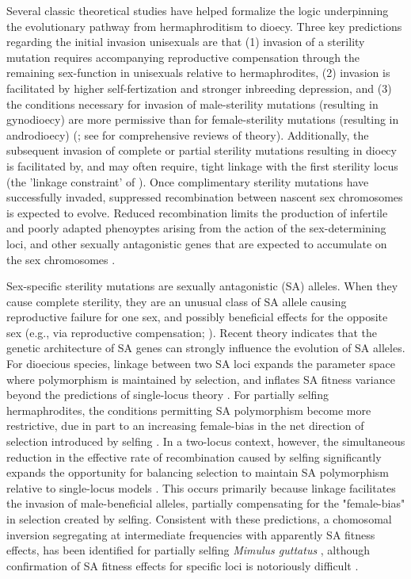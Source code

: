 \documentclass[9pt,twocolumn,twoside,lineno]{gsajnl}
\begin{document}
Several classic theoretical studies have helped formalize the logic underpinning the evolutionary pathway from hermaphroditism to dioecy. Three key predictions regarding the initial invasion unisexuals are that (1) invasion of a sterility mutation requires accompanying reproductive compensation through the remaining sex-function in unisexuals relative to hermaphrodites, (2) invasion is facilitated by higher self-fertization and stronger inbreeding depression, and (3) the conditions necessary for invasion of male-sterility mutations (resulting in gynodioecy) are more permissive than for female-sterility mutations (resulting in androdioecy) (\citealt{Lewis1941,Lloyd1975,Lloyd1976,Charlesworth1978a}; see \citealt{Charlesworth1999,Charlesworth2006} for comprehensive reviews of theory). Additionally, the subsequent invasion of complete or partial sterility mutations resulting in dioecy is facilitated by, and may often require, tight linkage with the first sterility locus (the 'linkage constraint' of \citealt{Charlesworth1978a}). Once complimentary sterility mutations have successfully invaded, suppressed recombination between nascent sex chromosomes is expected to evolve. Reduced recombination limits the production of infertile and poorly adapted phenoyptes arising from the action of the sex-determining loci, and other sexually antagonistic genes that are expected to accumulate on the sex chromosomes \citep{Charlesworth2002,Bachtrog2006}. 

Sex-specific sterility mutations are sexually antagonistic (SA) alleles. When they cause complete sterility, they are an unusual class of SA allele causing reproductive failure for one sex, and possibly beneficial effects for the opposite sex (e.g., via reproductive compensation; \citealt{Lewis1941,Lloyd1975,Charlesworth1978a}). Recent theory indicates that the genetic architecture of SA genes can strongly influence the evolution of SA alleles. For dioecious species, linkage between two SA loci expands the parameter space where polymorphism is maintained by selection, and inflates SA fitness variance beyond the predictions of single-locus theory \citep{Kidwell1977,Patten2010,UbedaPatten2010}. For partially selfing hermaphrodites, the conditions permitting SA polymorphism become more restrictive, due in part to an increasing female-bias in the net direction of selection introduced by selfing \citep{JordanConnallon2014}. In a two-locus context, however, the simultaneous reduction in the effective rate of recombination caused by selfing significantly expands the opportunity for balancing selection to maintain SA polymorphism relative to single-locus models \citep{Olito2017}. This occurs primarily because linkage facilitates the invasion of male-beneficial alleles, partially compensating for the "female-bias" in selection created by selfing. Consistent with these predictions, a chomosomal inversion segregating at intermediate frequencies with apparently SA fitness effects, has been identified for partially selfing \textit{Mimulus guttatus} \citep{LeeKelly2015}, although confirmation of SA fitness effects for specific loci is notoriously difficult \citep{ConnallonClark2012,Barson2015}.
\end{document}
